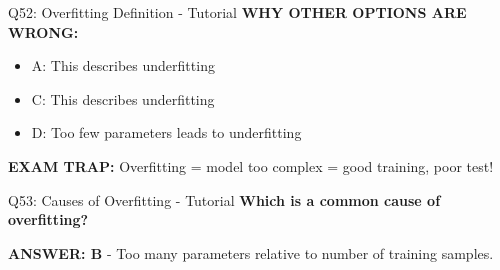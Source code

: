 \documentclass[8pt]{beamer}
\begin{document}
\begin{frame}{Q52: Overfitting Definition - Tutorial}
		\vspace{0.05cm}
		\textcolor{myred}{\textbf{WHY OTHER OPTIONS ARE WRONG:}}
		\begin{itemize}
			\item \textcolor{myred}{A:} This describes underfitting
			\item \textcolor{myred}{C:} This describes underfitting
			\item \textcolor{myred}{D:} Too few parameters leads to underfitting
		\end{itemize}
		
		\textcolor{myred}{\textbf{EXAM TRAP:}} Overfitting = model too complex = good training, poor test!
	\end{frame}
	
	\begin{frame}{Q53: Causes of Overfitting - Tutorial}
		\fontsize{6.5}{7.5}\selectfont
		\textbf{Which is a common cause of overfitting?}
		
		\vspace{0.05cm}
		\textcolor{myblue}{\textbf{ANSWER: B}} - Too many parameters relative to number of training samples.
		

\end{frame}
\end{document}
